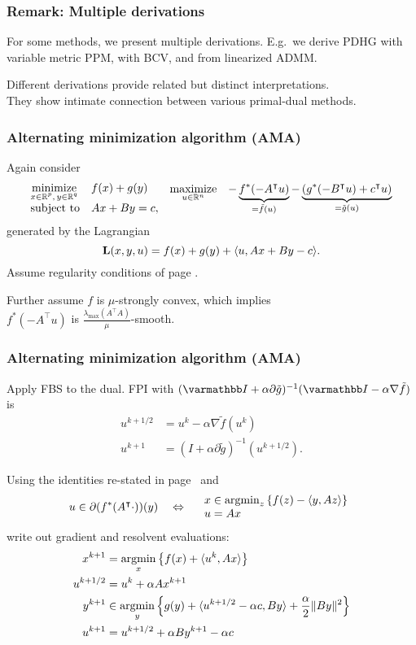 \documentclass[10pt,mathserif]{beamer}
\begin{document}
\begin{frame}
\frametitle{Remark: Multiple derivations}
For some methods, we present multiple derivations.
E.g.\ we derive PDHG with variable metric PPM, with BCV, and from linearized ADMM.

\vspace{0.2in}
Different derivations provide related but distinct interpretations.\\
They show intimate connection between various primal-dual methods.
\end{frame}


\begin{frame}[fragile]
\frametitle{Alternating minimization algorithm (AMA)}
Again consider
\begingroup\makeatletter\def\f@size{6}\check@mathfonts
\[
\begin{array}{ll}
\underset{\substack{x\in \mathbb{R}^p,\,y\in \mathbb{R}^q}}{\mbox{minimize}}&f(x)+g(y)\\
\mbox{subject to}&Ax+By=c,
\end{array}
\begin{array}{ll}
\underset{u  \in \mathbb{R}^n}{\mbox{maximize}}&-\underbrace{f^*(-A^\intercal u )}_{=\tilde{f}( u )}-\underbrace{(g^*(-B^\intercal u )+c^\intercal u )}_{=\tilde{g}( u )}
\end{array}
\]
\endgroup
generated by the Lagrangian 
\[
\mathbf{L}(x,y,u )=f(x)+g(y)+\langle u , Ax+By-c\rangle.
\]
Assume regularity conditions of page \pageref{frame_admm_first}.

\vspace{0.2in}
Further assume $f$ is $\mu$-strongly convex, which implies \\
$f^*(-A^\intercal u )$ is $\frac{\lambda_{\mathrm{max}}(A^\intercal A)}{\mu}$-smooth.
\end{frame}

\begin{frame}
\frametitle{Alternating minimization algorithm (AMA)}
Apply FBS to the dual.
FPI with $(\opI+\alpha \partial \tilde{g})^{-1}(\opI-\alpha \nabla \tilde{f})$ is
\begin{align*}
 u ^{k+1/2}&= u ^k-\alpha \nabla \tilde{f}( u ^k)\\
 u ^{k+1}&=
(I+\alpha\partial \tilde{g})^{-1}( u ^{k+1/2}).
\end{align*}

Using the identities re-stated in page~\pageref{frame_admm2} and
\[
u\in \partial (f^*(A^\intercal \cdot))(y)
\quad\Leftrightarrow\quad
\begin{array}{l}
x\in \operatorname*{argmin}_z\left\{
f(z)-\langle y, Az\rangle
\right\}\\
u= A x
\end{array}
\]
write out gradient and resolvent evaluations:
\begin{align*}
x^{k+1}&=\operatorname*{argmin}_x\left\{f(x)+\langle  u ^k,Ax\rangle \right\}\\
 u ^{k+1/2}&= u ^k+\alpha Ax^{k+1}\\
y^{k+1}&\in\operatorname*{argmin}_y\left\{ g(y)+\langle  u ^{k+1/2}-\alpha c,By\rangle +\frac{\alpha}{2}\|By\|^2\right\}\\
 u ^{k+1}&= u ^{k+1/2}+\alpha By^{k+1}-\alpha c
\end{align*}
\end{frame}
\end{document}
